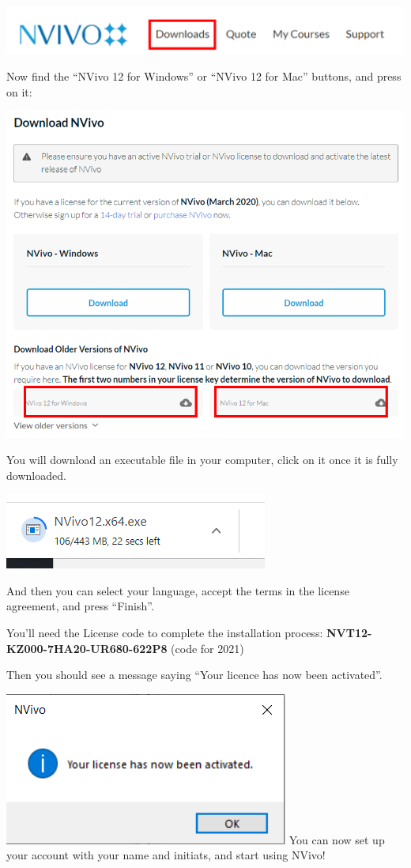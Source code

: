 \documentclass[
]{book}
\begin{document}
\includegraphics{imgs/nvivo_download.png}

Now find the ``NVivo 12 for Windows'' or ``NVivo 12 for Mac'' buttons, and press on it:

\includegraphics{imgs/nvivo_download12.png}

You will download an executable file in your computer, click on it once it is fully downloaded.

\includegraphics{imgs/nvivo_downloading.png}

And then you can select your language, accept the terms in the license agreement, and press ``Finish''.

You'll need the License code to complete the installation process: \textbf{NVT12-KZ000-7HA20-UR680-622P8} (code for 2021)

Then you should see a message saying ``Your licence has now been activated''.

\includegraphics{imgs/nvivo_activated.png}
You can now set up your account with your name and initiats, and start using NVivo!
\end{document}
